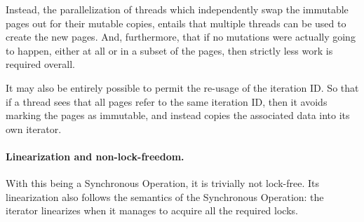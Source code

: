 Instead, the parallelization of threads which independently swap the immutable pages out for their mutable copies, entails that multiple threads can be used to create the new pages.
And, furthermore, that if no mutations were actually going to happen, either at all or in a subset of the pages, then strictly less work is required overall.

It may also be entirely possible to permit the re-usage of the iteration ID\@.
So that if a thread sees that all pages refer to the same iteration ID, then it avoids marking the pages as immutable, and instead copies the associated data into its own iterator.


\paragraph{Linearization and non-lock-freedom.}
With this being a Synchronous Operation, it is trivially not lock-free.
Its linearization also follows the semantics of the Synchronous Operation: the iterator linearizes when it manages to acquire all the required locks.
